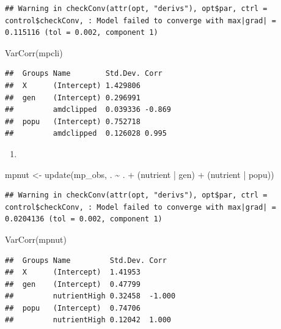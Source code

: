 \documentclass[
  12pt,
]{book}
\newenvironment{Shaded}{\begin{snugshade}}{\end{snugshade}}
\newcommand{\FunctionTok}[1]{\textcolor[rgb]{0.00,0.00,0.00}{#1}}
\newcommand{\NormalTok}[1]{#1}
\newcommand{\OtherTok}[1]{\textcolor[rgb]{0.56,0.35,0.01}{#1}}
\newcommand{\SpecialCharTok}[1]{\textcolor[rgb]{0.00,0.00,0.00}{#1}}
\providecommand{\tightlist}{%
  \setlength{\itemsep}{0pt}\setlength{\parskip}{0pt}}
\begin{document}
\begin{verbatim}
## Warning in checkConv(attr(opt, "derivs"), opt$par, ctrl = control$checkConv, : Model failed to converge with max|grad| = 0.115116 (tol = 0.002, component 1)
\end{verbatim}

\begin{Shaded}
\begin{Highlighting}[]
\FunctionTok{VarCorr}\NormalTok{(mpcli)}
\end{Highlighting}
\end{Shaded}

\begin{verbatim}
##  Groups Name        Std.Dev. Corr  
##  X      (Intercept) 1.429806       
##  gen    (Intercept) 0.296991       
##         amdclipped  0.039336 -0.869
##  popu   (Intercept) 0.752718       
##         amdclipped  0.126028 0.995
\end{verbatim}

\begin{enumerate}
\def\labelenumi{\arabic{enumi}.}
\setcounter{enumi}{1}
\tightlist
\item
\end{enumerate}

\begin{Shaded}
\begin{Highlighting}[]
\NormalTok{mpnut }\OtherTok{\textless{}{-}} \FunctionTok{update}\NormalTok{(mp\_obs, . }\SpecialCharTok{\textasciitilde{}}\NormalTok{ . }\SpecialCharTok{+}\NormalTok{ (nutrient }\SpecialCharTok{|}\NormalTok{ gen) }\SpecialCharTok{+}\NormalTok{ (nutrient }\SpecialCharTok{|}\NormalTok{ popu))}
\end{Highlighting}
\end{Shaded}

\begin{verbatim}
## Warning in checkConv(attr(opt, "derivs"), opt$par, ctrl = control$checkConv, : Model failed to converge with max|grad| = 0.0204136 (tol = 0.002, component 1)
\end{verbatim}

\begin{Shaded}
\begin{Highlighting}[]
\FunctionTok{VarCorr}\NormalTok{(mpnut)}
\end{Highlighting}
\end{Shaded}

\begin{verbatim}
##  Groups Name         Std.Dev. Corr  
##  X      (Intercept)  1.41953        
##  gen    (Intercept)  0.47799        
##         nutrientHigh 0.32458  -1.000
##  popu   (Intercept)  0.74706        
##         nutrientHigh 0.12042  1.000
\end{verbatim}
\end{document}
